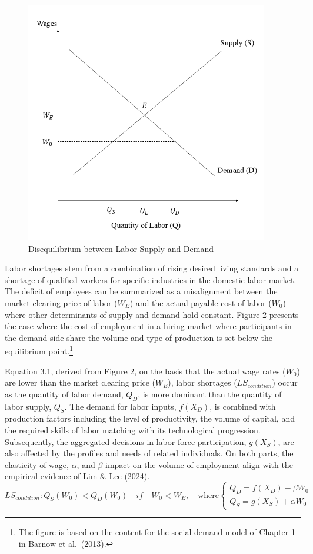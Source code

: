 \documentclass[
  12pt,
]{article}
\begin{document}
\begin{figure}
\centering
\includegraphics[width=4.16667in,height=\textheight,keepaspectratio]{figure/lbs.png}
\caption{Disequilibrium between Labor Supply and Demand}
\end{figure}

Labor shortages stem from a combination of rising desired living
standards and a shortage of qualified workers for specific industries in
the domestic labor market. The deficit of employees can be summarized as
a misalignment between the market-clearing price of labor (\(W_E\)) and
the actual payable cost of labor (\(W_0\)) where other determinants of
supply and demand hold constant. Figure 2 presents the case where the
cost of employment in a hiring market where participants in the demand
side share the volume and type of production is set below the
equilibrium point.\footnote{The figure is based on the content for the
  social demand model of Chapter 1 in Barnow et al.~(2013).}

Equation 3.1, derived from Figure 2, on the basis that the actual wage
rates (\(W_0\)) are lower than the market clearing price (\(W_E\)),
labor shortages (\(LS_{condition}\)) occur as the quantity of labor
demand, \(Q_D\), is more dominant than the quantity of labor supply,
\(Q_S\). The demand for labor inputs, \(f(X_D)\), is combined with
production factors including the level of productivity, the volume of
capital, and the required skills of labor matching with its
technological progression. Subsequently, the aggregated decisions in
labor force participation, \(g(X_S)\), are also affected by the profiles
and needs of related individuals. On both parts, the elasticity of wage,
\(\alpha\), and \(\beta\) impact on the volume of employment align with
the empirical evidence of Lim \& Lee (2024).\\
\[
LS_{condition}: Q_S(W_0) < Q_D(W_0)\quad if \quad W_0 < W_E, \quad \text{where}
\begin{cases}
Q_D = f(X_D)-\beta W_0 \\
Q_S = g(X_S)+\alpha W_0
\end{cases}
\tag{3.1}
\]
\end{document}
